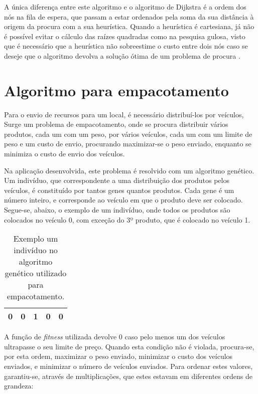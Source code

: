 \documentclass[12pt, a4paper]{article}
\begin{document}
A única diferença entre este algoritmo e o algoritmo de Dijkstra é a ordem dos nós na fila de
espera, que passam a estar ordenados pela soma da sua distância à origem da procura com a sua
heurística. Quando a heurística é cartesiana, já não é possível evitar o cálculo das raízes
quadradas como na pesquisa gulosa, visto que é necessário que a heurística não sobreestime o custo
entre dois nós caso se deseje que o algoritmo devolva a solução ótima de um problema de procura
\cite{aima}.

\section{Algoritmo para empacotamento}

Para o envio de recursos para um local, é necessário distribuí-los por veículos, Surge um problema
de empacotamento, onde se procura distribuir vários produtos, cada um com um peso, por vários
veículos, cada um com um limite de peso e um custo de envio, procurando maximizar-se o peso enviado,
enquanto se minimiza o custo de envio dos veículos.

Na aplicação desenvolvida, este problema é resolvido com um algoritmo genético. Um indivíduo, que
correspondente a uma distribuição dos produtos pelos veículos, é constituído por tantos genes
quantos produtos. Cada gene é um número inteiro, e corresponde ao veículo em que o produto deve ser
colocado. Segue-se, abaixo, o exemplo de um indivíduo, onde todos os produtos são colocados no
veículo 0, com exceção do 3º produto, que é colocado no veículo 1.

\begin{table}[H]
    \begin{center}
        \begin{tabular}{|c|c|c|c|c|}
            \hline 0 & 0 & 1 & 0 & 0 \\ \hline
        \end{tabular}

        \caption{Exemplo um indivíduo no algoritmo genético utilizado para empacotamento.}
    \end{center}
\end{table}

A função de \emph{fitness} utilizada devolve 0 caso pelo menos um dos veículos ultrapasse o seu
limite de preço. Quando esta condição não é violada, procura-se, por esta ordem, maximizar o
peso enviado, minimizar o custo dos veículos enviados, e minimizar o número de veículos enviados.
Para ordenar estes valores, garantiu-se, através de multiplicações, que estes estavam em diferentes
ordens de grandeza:
\end{document}
